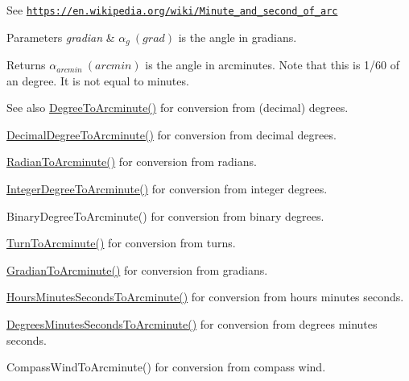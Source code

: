 See \href{https://en.wikipedia.org/wiki/Minute_and_second_of_arc}{\tt https\+://en.\+wikipedia.\+org/wiki/\+Minute\+\_\+and\+\_\+second\+\_\+of\+\_\+arc} 
\begin{DoxyParams}{Parameters}
{\em gradian} & $\alpha_{g}\ (grad)$ is the angle in gradians. \\
\hline
\end{DoxyParams}
\begin{DoxyReturn}{Returns}
$\alpha_{arcmin}\ (arcmin)$ is the angle in arcminutes. Note that this is 1/60 of an degree. It is not equal to minutes. 
\end{DoxyReturn}
\begin{DoxySeeAlso}{See also}
\mbox{\hyperlink{group___e_g_x_math-_conversions-_angle_conversions-_degree_ga8abf327dc5f52907b2c881999e9cc43e}{Degree\+To\+Arcminute()}} for conversion from (decimal) degrees. 

\mbox{\hyperlink{group___e_g_x_math-_conversions-_angle_conversions-_decimal_degree_ga6b6ea6e45d2a13f556824ca419cc9fbd}{Decimal\+Degree\+To\+Arcminute()}} for conversion from decimal degrees. 

\mbox{\hyperlink{group___e_g_x_math-_conversions-_angle_conversions-_radian_ga722e3b8e78540a6b3942b73b64aeb8d2}{Radian\+To\+Arcminute()}} for conversion from radians. 

\mbox{\hyperlink{group___e_g_x_math-_conversions-_angle_conversions-_integer_degree_ga78b014e7649d666a3647c467e64e4fe8}{Integer\+Degree\+To\+Arcminute()}} for conversion from integer degrees. 

Binary\+Degree\+To\+Arcminute() for conversion from binary degrees. 

\mbox{\hyperlink{group___e_g_x_math-_conversions-_angle_conversions-_turn_ga72cda928d9043c7d82097b1a7920769e}{Turn\+To\+Arcminute()}} for conversion from turns. 

\mbox{\hyperlink{group___e_g_x_math-_conversions-_angle_conversions-_gradian_ga67ef7daad49b0d73c39c52d426ab46a5}{Gradian\+To\+Arcminute()}} for conversion from gradians. 

\mbox{\hyperlink{group___e_g_x_math-_conversions-_angle_conversions-_hours_minutes_seconds_ga23bfa5abeb014726c2e2ac6303be5dae}{Hours\+Minutes\+Seconds\+To\+Arcminute()}} for conversion from hours minutes seconds. 

\mbox{\hyperlink{group___e_g_x_math-_conversions-_angle_conversions-_degrees_minutes_seconds_gadb8da2c4b9cdd4f618b6281314b1318c}{Degrees\+Minutes\+Seconds\+To\+Arcminute()}} for conversion from degrees minutes seconds. 

Compass\+Wind\+To\+Arcminute() for conversion from compass wind. 
\end{DoxySeeAlso}
\mbox{\label{group___e_g_x_math-_conversions-_angle_conversions-_gradian_gac768fd444195264165d332f2f5e84d92}} 
